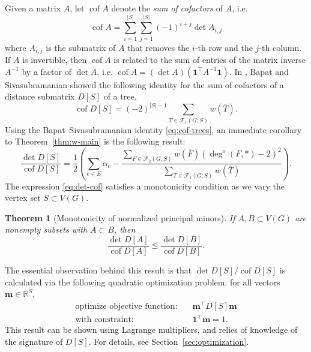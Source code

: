\documentclass{amsart}
\newtheorem{thm}{Theorem}[section]
\newtheorem{prop}[thm]{Proposition}
\theoremstyle{definition}
\newcommand{\RR}{\mathbb{R}}
\newcommand{\bone}{\mathbf{1}}
\newcommand{\boldm}{\mathbf{m}}
\newcommand{\Da}{{D^{(\alpha)}}}
\newcommand{\tr}{\intercal}
\DeclareMathOperator{\cof}{cof}
\newcommand{\trees}{\mathcal{F}_1}
\newcommand{\forests}{\mathcal{F}}
\newcommand{\degout}{\deg^o}
\begin{document}
Given a matrix $A$, let $\cof A$ denote the {\em sum of cofactors} of $A$, i.e. 
\[
	\cof A = \sum_{i = 1}^{|S|} \sum_{j = 1}^{|S|} (-1)^{i + j} \det A_{i,j} 
\]
where $A_{i,j}$ is the submatrix of $A$ that removes the $i$-th row and the $j$-th column.
If $A$ is invertible, then $\cof A$ is related to the sum of entries of the matrix inverse $A^{-1}$ by a factor of $\det A$, i.e. $\cof A = (\det A) (\bone^\tr A^{-1} \bone)$.
In \cite{bapat-sivasubramanian}, Bapat and Sivasubramanian showed the following identity for 
the sum of cofactors of a distance submatrix $D[S]$ of a tree,
\begin{equation}\label{eq:cof-trees}
	\cof D[S] = (-2)^{|S| - 1} \sum_{T \in \trees(G;S)} w(\overline{T}) .
\end{equation}
Using the Bapat--Sivasubramanian identity \eqref{eq:cof-trees}, an immediate corollary to Theorem~\ref{thm:w-main} is the following result:
\begin{equation}
\label{eq:det-cof}
	\frac{\det D[S]}{\cof D[S]} = \frac12 \left( \sum_{e \in E} \alpha_e - \frac{\sum_{F \in \forests_2(G; S)} w(\overline{F}) (\degout(F,*) - 2)^2}{\sum_{T \in \trees(G; S)} w(\overline{T})} \right).
\end{equation}
The expression \eqref{eq:det-cof} satisfies a monotonicity condition as we vary the vertex set $S \subset V(G)$.

\begin{thm}[Monotonicity of normalized principal minors]
\label{thm:monotonic}
If $A,B \subset V(G)$
are nonempty subsets with
$A \subset B$,
then
\begin{equation*}
	\frac{\det D[A]}{\cof D[A]}  \leq \frac{\det D[B]}{\cof D[B]}.
\end{equation*}
\end{thm}
The essential observation behind this result is that $\det D[S] / \cof D[S]$ is calculated via the following quadratic optimization problem: for all vectors $ \boldm \in \RR^S$,
\begin{align}
	\text{optimize objective function:} &\quad \boldm^\tr D[S] \boldm \\
	\text{with constraint:} &\quad \bone^\tr \boldm = 1.
\end{align}
This result can be shown using Lagrange multipliers,
and relies of knowledge of the signature of $D[S]$.
For details, see Section~\ref{sec:optimization}.
\end{document}
